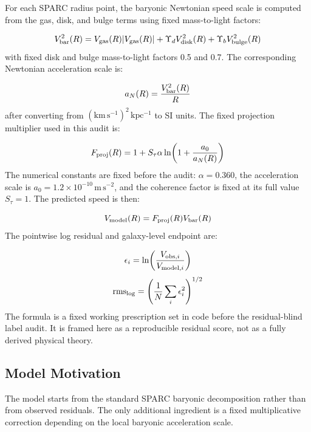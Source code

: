 \documentclass[11pt]{article}
\begin{document}
For each SPARC radius point, the baryonic Newtonian speed scale is computed from the gas, disk, and bulge terms using fixed mass-to-light factors:

\begin{equation}
V_{\rm bar}^2(R)=V_{\rm gas}(R)|V_{\rm gas}(R)|+\Upsilon_d V_{\rm disk}^2(R)+\Upsilon_b V_{\rm bulge}^2(R)
\end{equation}
with fixed disk and bulge mass-to-light factors 0.5 and 0.7. The corresponding Newtonian acceleration scale is:

\begin{equation}
a_N(R)=\frac{V_{\rm bar}^2(R)}{R}
\end{equation}
after converting from $\mathrm{(km\,s^{-1})^2\,kpc^{-1}}$ to SI units. The fixed projection multiplier used in this audit is:

\begin{equation}
F_{\rm proj}(R)=1+S_\tau\alpha\ln\!\left(1+\frac{a_0}{a_N(R)}\right)
\end{equation}
The numerical constants are fixed before the audit: $\alpha = 0.360$, the acceleration scale is $a_0 = 1.2\times 10^{-10}\,\mathrm{m\,s^{-2}}$, and the coherence factor is fixed at its full value $S_\tau = 1$. The predicted speed is then:

\begin{equation}
V_{\rm model}(R)=F_{\rm proj}(R)V_{\rm bar}(R)
\end{equation}
The pointwise log residual and galaxy-level endpoint are:

\begin{equation}
\epsilon_i=\ln\!\left(\frac{V_{{\rm obs},i}}{V_{{\rm model},i}}\right)
\end{equation}
\begin{equation}
{\rm rms}_{\log}=\left(\frac{1}{N}\sum_i\epsilon_i^2\right)^{1/2}
\end{equation}
The formula is a fixed working prescription set in code before the residual-blind label audit. It is framed here as a reproducible residual score, not as a fully derived physical theory.

\subsection{Model Motivation}
The model starts from the standard SPARC baryonic decomposition rather than from observed residuals. The only additional ingredient is a fixed multiplicative correction depending on the local baryonic acceleration scale.
\end{document}
